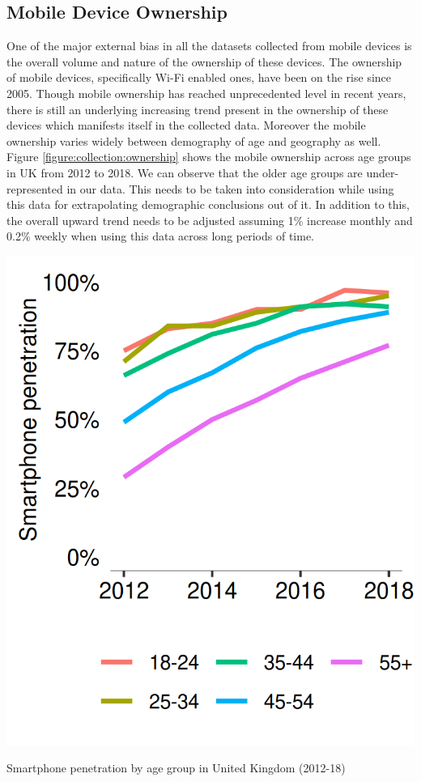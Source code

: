 \subsection{Mobile Device Ownership}
One of the major external bias in all the datasets collected from mobile devices is the overall volume and nature of the ownership of these devices.
The ownership of mobile devices, specifically Wi-Fi enabled ones, have been on the rise since 2005.
Though mobile ownership has reached unprecedented level in recent years, there is still an underlying increasing trend present in the ownership of these devices which manifests itself in the collected data.
Moreover the mobile ownership varies widely between demography of age and geography as well. 
Figure \ref{figure:collection:ownership} shows the mobile ownership across age groups in UK from 2012 to 2018.
We can observe that the older age groups are under-represented in our data.
This needs to be taken into consideration while using this data for extrapolating demographic conclusions out of it.
In addition to this, the overall upward trend needs to be adjusted assuming 1\% increase monthly and 0.2\% weekly when using this data across long periods of time.

\begin{marginfigure}
  \includegraphics{images/mobile-ownership.png}
  \caption{Smartphone penetration by age group in United Kingdom (2012-18)}
  \label{figure:collection:ownership}
\end{marginfigure}




